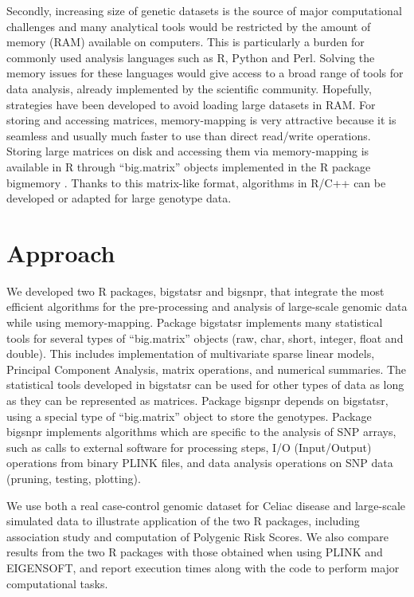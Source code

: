 \documentclass{bioinfo}
\begin{document}
Secondly, increasing size of genetic datasets is the source of major computational challenges and many analytical tools would be restricted by the amount of memory (RAM) available on computers. This is particularly a burden for commonly used analysis languages such as R, Python and Perl. Solving the memory issues for these languages would give access to a broad range of tools for data analysis, already implemented by the scientific community. Hopefully, strategies have been developed to avoid loading large datasets in RAM. For storing and accessing matrices, memory-mapping is very attractive because it is seamless and usually much faster to use than direct read/write operations. Storing large matrices on disk and accessing them via memory-mapping is available in R through ``big.matrix'' objects implemented in the R package bigmemory \cite[]{Kane2013}. Thanks to this matrix-like format, algorithms in R/C++ can be developed or adapted for large genotype data. 


\section{Approach}

We developed two R packages, bigstatsr and bigsnpr, that integrate the most efficient algorithms for the pre-processing and analysis of large-scale genomic data while using memory-mapping. Package bigstatsr implements many statistical tools for several types of ``big.matrix'' objects (raw, char, short, integer, float and double). This includes implementation of multivariate sparse linear models, Principal Component Analysis, matrix operations, and numerical summaries. The statistical tools developed in bigstatsr can be used for other types of data as long as they can be represented as matrices. Package bigsnpr depends on bigstatsr, using a special type of ``big.matrix'' object to store the genotypes. Package bigsnpr implements algorithms which are specific to the analysis of SNP arrays, such as calls to external software for processing steps, I/O (Input/Output) operations from binary PLINK files, and data analysis operations on SNP data (pruning, testing, plotting). 


We use both a real case-control genomic dataset for Celiac disease and large-scale simulated data to illustrate application of the two R packages, including association study and computation of Polygenic Risk Scores. We also compare results from the two R packages with those obtained when using PLINK and EIGENSOFT, and report execution times along with the code to perform major computational tasks.
\end{document}
